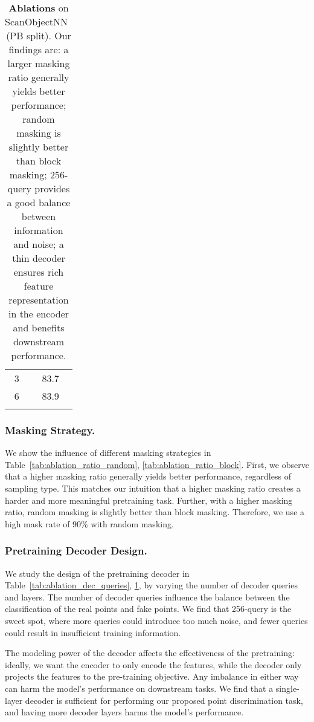 \documentclass[runningheads]{llncs}
\begin{document}
\begin{table}[t]
\begin{subtable}[t]{.24\linewidth}
\begin{tabular}[t]{cc}
            3 & 83.7 \\
            6 & 83.9 \\
            \\
        \end{tabular}
        \label{tab:ablation_dec_layers}
    \end{subtable}
    \caption{\textbf{Ablations} on ScanObjectNN~\cite{uy2019revisiting} (PB split).  Our findings are: a larger masking ratio generally yields better performance; random masking is slightly better than block masking; 256-query provides a good balance between information and noise; a thin decoder ensures rich feature representation in the encoder and benefits downstream performance.}
\end{table}

\subsubsection{Masking Strategy.}
We show the influence of different masking strategies in Table~\ref{tab:ablation_ratio_random}, \ref{tab:ablation_ratio_block}. First, we observe that a higher masking ratio generally yields better performance, regardless of sampling type.  This matches our intuition that a higher masking ratio creates a harder and more meaningful pretraining task.  Further, with a higher masking ratio, random masking is slightly better than block masking.  Therefore, we use a high mask rate of 90\% with random masking.

\vspace{-10pt}
\subsubsection{Pretraining Decoder Design.}
We study the design of the pretraining decoder in Table~\ref{tab:ablation_dec_queries}, \ref{tab:ablation_dec_layers}, by varying the number of decoder queries and layers. The number of decoder queries influence the balance between the classification of the real points and fake points.  We find that 256-query is the sweet spot, where more queries could introduce too much noise, and fewer queries could result in insufficient training information.

The modeling power of the decoder affects the effectiveness of the pretraining: ideally, we want the encoder to only encode the features, while the decoder only projects the features to the pre-training objective.  Any imbalance in either way can harm the model's performance on downstream tasks.  We find that a single-layer decoder is sufficient for performing our proposed point discrimination task, and having more decoder layers harms the model's performance.
\end{document}
